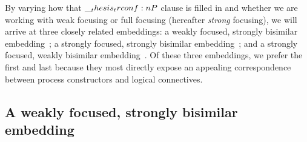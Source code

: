 By varying how that $\__thesis_trconf:n {P}$ clause is filled in and whether we are working with weak focusing or full focusing (hereafter \emph{strong} focusing), we will arrive at three closely related embeddings: a weakly focused, strongly bisimilar embedding~; a strongly focused, strongly bisimilar embedding~; and a strongly focused, weakly bisimilar embedding~.
Of these three embeddings, we prefer the first and last because they most directly expose an appealing correspondence between process constructors and logical connectives.


\subsection{A weakly focused, strongly bisimilar embedding}\label{sec:embed:weak-focused-strong-bisim}




